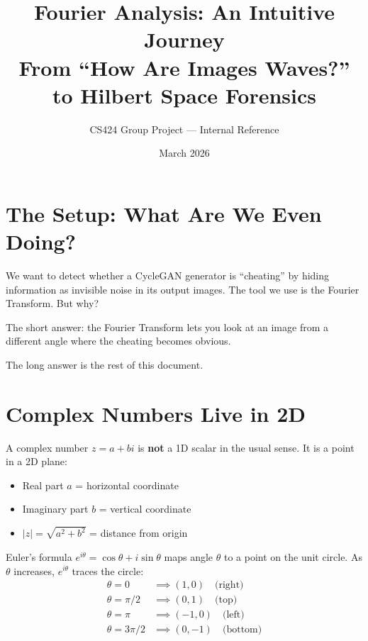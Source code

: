 \documentclass[11pt,a4paper]{article}
\title{\textbf{Fourier Analysis: An Intuitive Journey} \\[0.5em]
\Large From ``How Are Images Waves?'' to Hilbert Space Forensics}
\author{CS424 Group Project --- Internal Reference}
\date{March 2026}
\theoremstyle{definition}
\begin{document}
\maketitle
\tableofcontents
\newpage

\section{The Setup: What Are We Even Doing?}

We want to detect whether a CycleGAN generator is ``cheating'' by hiding information as invisible noise in its output images. The tool we use is the Fourier Transform. But why?

The short answer: the Fourier Transform lets you look at an image from a different angle where the cheating becomes obvious.

The long answer is the rest of this document.

\section{Complex Numbers Live in 2D}

A complex number $z = a + bi$ is \textbf{not} a 1D scalar in the usual sense. It is a point in a 2D plane:
\begin{itemize}
    \item Real part $a$ = horizontal coordinate
    \item Imaginary part $b$ = vertical coordinate
    \item $|z| = \sqrt{a^2 + b^2}$ = distance from origin
\end{itemize}

Euler's formula $e^{i\theta} = \cos\theta + i\sin\theta$ maps angle $\theta$ to a point on the unit circle. As $\theta$ increases, $e^{i\theta}$ traces the circle:
\begin{align}
    \theta = 0 &\implies (1, 0) \quad\text{(right)} \\
    \theta = \pi/2 &\implies (0, 1) \quad\text{(top)} \\
    \theta = \pi &\implies (-1, 0) \quad\text{(left)} \\
    \theta = 3\pi/2 &\implies (0, -1) \quad\text{(bottom)}
\end{align}
\end{document}
